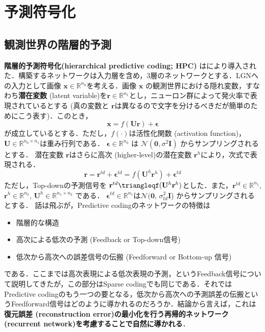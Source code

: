 \section{予測符号化}
\subsection{観測世界の階層的予測}
\textbf{階層的予測符号化(hierarchical predictive coding; HPC)} は\citep{Rao1999-zv}により導入された．構築するネットワークは入力層を含め，3層のネットワークとする．LGNへの入力として画像 $\mathbf{x} \in \mathbb{R}^{n_0}$を考える．画像 $\mathbf{x}$ の観測世界における隠れ変数，すなわち\textbf{潜在変数} (latent variable)を$\mathbf{r} \in \mathbb{R}^{n_1}$とし，ニューロン群によって発火率で表現されているとする (真の変数と $\mathbf{r}$は異なるので文字を分けるべきだが簡単のためにこう表す)．このとき，
\begin{equation}
\mathbf{x} = f(\mathbf{U}\mathbf{r}) + \boldsymbol{\epsilon}
\end{equation}
が成立しているとする．ただし，$f(\cdot)$は活性化関数 (activation function)，$\mathbf{U} \in \mathbb{R}^{n_0 \times n_1}$は重み行列である．
$\boldsymbol{\epsilon} \in \mathbb{R}^{n_0}$ は $\mathcal{N}(\mathbf{0}, \sigma^2 \mathbf{I})$ からサンプリングされるとする．
潜在変数 $\mathbf{r}$はさらに高次 (higher-level)の潜在変数 $\mathbf{r}^h$により，次式で表現される．
\begin{equation}
\mathbf{r} = \mathbf{r}^{td}+\boldsymbol{\epsilon}^{td}=f(\mathbf{U}^h \mathbf{r}^h)+\boldsymbol{\epsilon}^{td}
\end{equation}
ただし，Top-downの予測信号を $\mathbf{r}^{td}\triangleqf(\mathbf{U}^h \mathbf{r}^h)$とした．また，$\mathbf{r}^{td} \in \mathbb{R}^{n_1}$, $\mathbf{r}^{h} \in \mathbb{R}^{n_2}$, $\mathbf{U}^h \in \mathbb{R}^{n_1 \times n_2}$ である．
$\boldsymbol{\epsilon}^{td} \in \mathbb{R}^{n_1}$は$\mathcal{N}(\mathbf{0}$, $\sigma_{td}^2 \mathbf{I}$) からサンプリングされるとする．
話は飛ぶが，Predictive codingのネットワークの特徴は
\begin{itemize}
\item 階層的な構造
\item 高次による低次の予測 (Feedback or Top-down信号)
\item 低次から高次への誤差信号の伝搬 (Feedforward or Bottom-up 信号)
\end{itemize}
である．ここまでは高次表現による低次表現の予測，というFeedback信号について説明してきたが，この部分はSparse codingでも同じである．それではPredictive codingのもう一つの要となる，低次から高次への予測誤差の伝搬というFeedforward信号はどのように導かれるのだろうか．結論から言えば，これは\textbf{復元誤差 (reconstruction error)の最小化を行う再帰的ネットワーク (recurrent network)を考慮することで自然に導かれる}．
